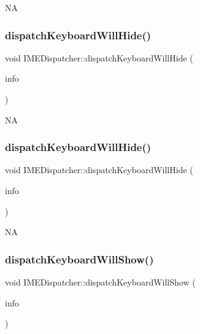NA \mbox{\label{classIMEDispatcher_aec4b9bee27550e70c9b78e7b2ed5f138}} 
\subsubsection{\texorpdfstring{dispatch\+Keyboard\+Will\+Hide()}{dispatchKeyboardWillHide()}\hspace{0.1cm}{\footnotesize\ttfamily [1/2]}}
{\footnotesize\ttfamily void I\+M\+E\+Dispatcher\+::dispatch\+Keyboard\+Will\+Hide (\begin{DoxyParamCaption}\item[{\hyperlink{structIMEKeyboardNotificationInfo}{I\+M\+E\+Keyboard\+Notification\+Info} \&}]{info }\end{DoxyParamCaption})}

NA \mbox{\label{classIMEDispatcher_aec4b9bee27550e70c9b78e7b2ed5f138}} 
\subsubsection{\texorpdfstring{dispatch\+Keyboard\+Will\+Hide()}{dispatchKeyboardWillHide()}\hspace{0.1cm}{\footnotesize\ttfamily [2/2]}}
{\footnotesize\ttfamily void I\+M\+E\+Dispatcher\+::dispatch\+Keyboard\+Will\+Hide (\begin{DoxyParamCaption}\item[{\hyperlink{structIMEKeyboardNotificationInfo}{I\+M\+E\+Keyboard\+Notification\+Info} \&}]{info }\end{DoxyParamCaption})}

NA \mbox{\label{classIMEDispatcher_a51d272229b8a061bdf38ee460c2fba03}} 
\subsubsection{\texorpdfstring{dispatch\+Keyboard\+Will\+Show()}{dispatchKeyboardWillShow()}\hspace{0.1cm}{\footnotesize\ttfamily [1/2]}}
{\footnotesize\ttfamily void I\+M\+E\+Dispatcher\+::dispatch\+Keyboard\+Will\+Show (\begin{DoxyParamCaption}\item[{\hyperlink{structIMEKeyboardNotificationInfo}{I\+M\+E\+Keyboard\+Notification\+Info} \&}]{info }\end{DoxyParamCaption})}


